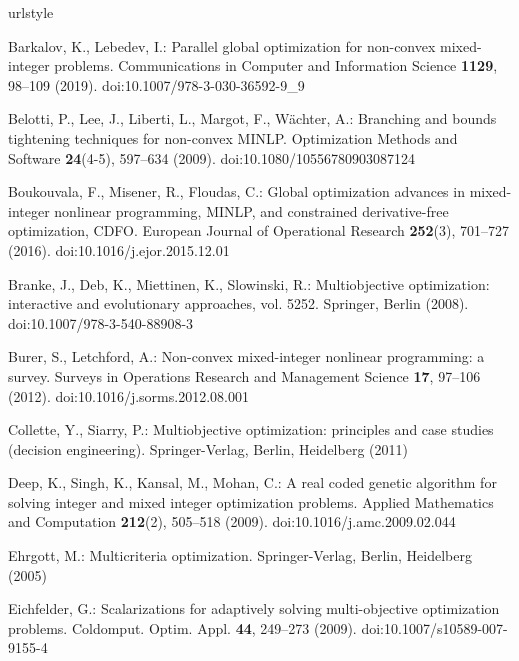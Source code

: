 \documentclass{svproc}
\begin{document}
\begin{thebibliography}{10}
\providecommand{\url}[1]{{#1}}
\providecommand{\urlprefix}{URL }
\expandafter\ifx\csname urlstyle\endcsname\relax
  \providecommand{\doi}[1]{doi:\discretionary{}{}{}#1}\else
  \providecommand{\doi}{doi:\discretionary{}{}{}\begingroup
  \urlstyle{rm}\Url}\fi

Barkalov, K., Lebedev, I.: Parallel global optimization for non-convex
  mixed-integer problems.
\newblock Communications in Computer and Information Science \textbf{1129},
  98--109 (2019).
\newblock \doi{10.1007/978-3-030-36592-9_9}

Belotti, P., Lee, J., Liberti, L., Margot, F., W{\" a}chter, A.: Branching and
  bounds tightening techniques for non-convex {MINLP}.
\newblock Optimization Methods and Software \textbf{24}(4-5), 597--634 (2009).
\newblock \doi{10.1080/10556780903087124}

Boukouvala, F., Misener, R., Floudas, C.: {Global optimization advances in
  mixed-integer nonlinear programming, MINLP, and constrained derivative-free
  optimization, CDFO}.
\newblock European Journal of Operational Research \textbf{252}(3), 701--727
  (2016).
\newblock \doi{10.1016/j.ejor.2015.12.01}

Branke, J., Deb, K., Miettinen, K., Slowinski, R.: Multiobjective optimization:
  interactive and evolutionary approaches, vol. 5252.
\newblock Springer, Berlin (2008).
\newblock \doi{10.1007/978-3-540-88908-3}

Burer, S., Letchford, A.: Non-convex mixed-integer nonlinear programming: a
  survey.
\newblock Surveys in Operations Research and Management Science \textbf{17},
  97--106 (2012).
\newblock \doi{10.1016/j.sorms.2012.08.001}

Collette, Y., Siarry, P.: Multiobjective optimization: principles and case
  studies (decision engineering).
\newblock Springer-Verlag, Berlin, Heidelberg (2011)

Deep, K., Singh, K., Kansal, M., Mohan, C.: A real coded genetic algorithm for
  solving integer and mixed integer optimization problems.
\newblock Applied Mathematics and Computation \textbf{212}(2), 505--518 (2009).
\newblock \doi{10.1016/j.amc.2009.02.044}

Ehrgott, M.: Multicriteria optimization.
\newblock Springer-Verlag, Berlin, Heidelberg (2005)

Eichfelder, G.: Scalarizations for adaptively solving multi-objective
  optimization problems.
\newblock Coldomput. Optim. Appl. \textbf{44}, 249--273 (2009).
\newblock \doi{10.1007/s10589-007-9155-4}


\end{thebibliography}
\end{document}
